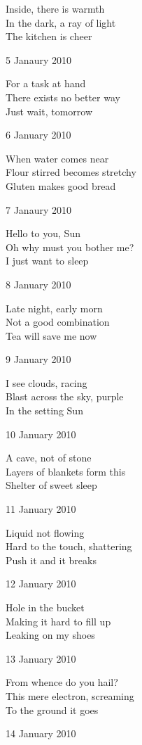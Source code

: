 \documentclass[12pt]{article}
\begin{document}
Inside, there is warmth \\
In the dark, a ray of light \\
The kitchen is cheer

5 Janaury 2010

For a task at hand \\
There exists no better way \\
Just wait, tomorrow

6 January 2010

When water comes near \\
Flour stirred becomes stretchy \\
Gluten makes good bread

7 Janaury 2010

Hello to you, Sun \\
Oh why must you bother me? \\
I just want to sleep

8 January 2010

Late night, early morn \\
Not a good combination \\
Tea will save me now

9 January 2010

I see clouds, racing \\
Blast across the sky, purple \\
In the setting Sun

10 January 2010

A cave, not of stone \\
Layers of blankets form this \\
Shelter of sweet sleep



\newpage

11 January 2010

Liquid not flowing \\
Hard to the touch, shattering \\
Push it and it breaks

12 January 2010

Hole in the bucket \\
Making it hard to fill up \\
Leaking on my shoes

13 January 2010

From whence do you hail? \\
This mere electron, screaming \\
To the ground it goes

14 January 2010
\end{document}

